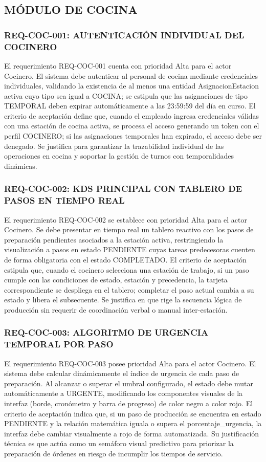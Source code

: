 \subsection{MÓDULO DE COCINA}

\subsubsection{REQ-COC-001: AUTENTICACIÓN INDIVIDUAL DEL COCINERO}
El requerimiento REQ-COC-001 cuenta con prioridad Alta para el actor Cocinero. El sistema debe autenticar al personal de cocina mediante credenciales individuales, validando la existencia de al menos una entidad AsignacionEstacion activa cuyo tipo sea igual a COCINA; se estipula que las asignaciones de tipo TEMPORAL deben expirar automáticamente a las 23:59:59 del día en curso. El criterio de aceptación define que, cuando el empleado ingresa credenciales válidas con una estación de cocina activa, se procesa el acceso generando un token con el perfil COCINERO; si las asignaciones temporales han expirado, el acceso debe ser denegado. Se justifica para garantizar la trazabilidad individual de las operaciones en cocina y soportar la gestión de turnos con temporalidades dinámicas.

\subsubsection{REQ-COC-002: KDS PRINCIPAL CON TABLERO DE PASOS EN TIEMPO REAL}
El requerimiento REQ-COC-002 se establece con prioridad Alta para el actor Cocinero. Se debe presentar en tiempo real un tablero reactivo con los pasos de preparación pendientes asociados a la estación activa, restringiendo la visualización a pasos en estado PENDIENTE cuyas tareas predecesoras cuenten de forma obligatoria con el estado COMPLETADO. El criterio de aceptación estipula que, cuando el cocinero selecciona una estación de trabajo, si un paso cumple con las condiciones de estado, estación y precedencia, la tarjeta correspondiente se despliega en el tablero; completar el paso actual cambia a su estado y libera el subsecuente. Se justifica en que rige la secuencia lógica de producción sin requerir de coordinación verbal o manual inter-estación.

\subsubsection{REQ-COC-003: ALGORITMO DE URGENCIA TEMPORAL POR PASO}
El requerimiento REQ-COC-003 posee prioridad Alta para el actor Cocinero. El sistema debe calcular dinámicamente el índice de urgencia de cada paso de preparación. Al alcanzar o superar el umbral configurado, el estado debe mutar automáticamente a URGENTE, modificando los componentes visuales de la interfaz (borde, cronómetro y barra de progreso) de color negro a color rojo. El criterio de aceptación indica que, si un paso de producción se encuentra en estado PENDIENTE y la relación matemática iguala o supera el porcentaje\_urgencia, la interfaz debe cambiar visualmente a rojo de forma automatizada. Su justificación técnica es que actúa como un semáforo visual predictivo para priorizar la preparación de órdenes en riesgo de incumplir los tiempos de servicio.

